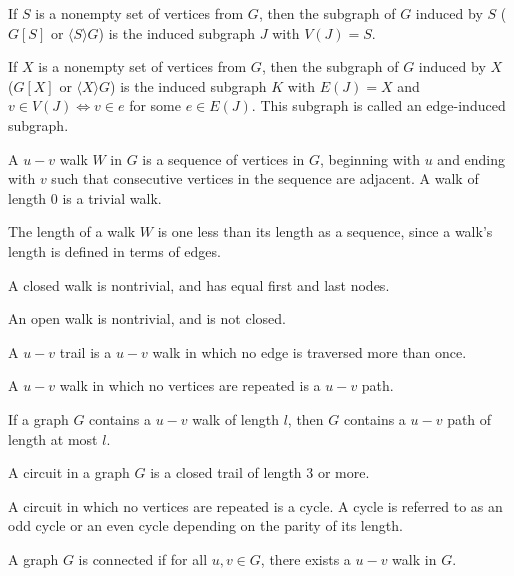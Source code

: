 \documentclass{article}
\begin{document}
    If $S$ is a nonempty set of vertices from $G$, then the subgraph of $G$ induced by $S$ ($G[S]$ or $\langle S \rangle G$) is the induced subgraph $J$ with $V(J) = S$.

    If $X$ is a nonempty set of vertices from $G$, then the subgraph of $G$ induced by $X$ ($G[X]$ or $\langle X \rangle G$) is the induced subgraph $K$ with $E(J) = X$ and $v \in V(J) \iff v \in e$ for some $e \in E(J)$. This subgraph is called an edge-induced subgraph.

\medskip{}

    A $u-v$ walk $W$ in $G$ is a sequence of vertices in $G$, beginning with $u$ and ending with $v$ such that consecutive vertices in the sequence are adjacent. A walk of length 0 is a trivial walk.

    The length of a walk $W$ is one less than its length as a sequence, since a walk's length is defined in terms of edges.

\medskip{}

    A closed walk is nontrivial, and has equal first and last nodes.

\medskip{}

    An open walk is nontrivial, and is not closed.

\medskip{}

    A $u-v$ trail is a $u-v$ walk in which no edge is traversed more than once.

\medskip{}

    A $u-v$ walk in which no vertices are repeated is a $u-v$ path.

\medskip{}

    If a graph $G$ contains a $u-v$ walk of length $l$, then $G$ contains a $u-v$ path of length at most $l$.

\medskip{}

    A circuit in a graph $G$ is a closed trail of length 3 or more.

\medskip{}

    A circuit in which no vertices are repeated is a cycle. A cycle is referred to as an odd cycle or an even cycle depending on the parity of its length.

\medskip{}

    A graph $G$ is connected if for all $u,v \in G$, there exists a $u-v$ walk in $G$.
\end{document}
